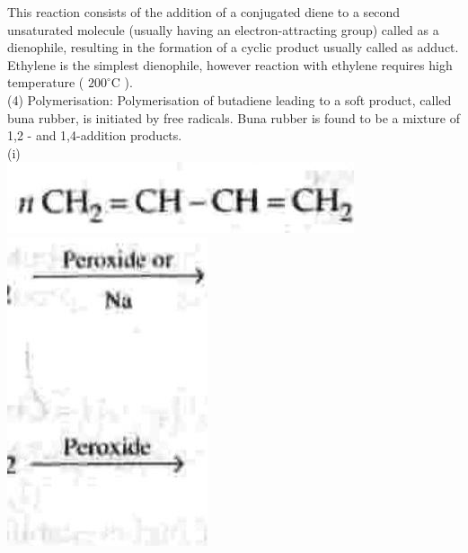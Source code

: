 \documentclass[10pt]{article}
\begin{document}
This reaction consists of the addition of a conjugated diene to a second unsaturated molecule (usually having an electron-attracting group) called as a dienophile, resulting in the formation of a cyclic product usually called as adduct. Ethylene is the simplest dienophile, however reaction with ethylene requires high temperature ( $200^{\circ} \mathrm{C}$ ).\\
(4) Polymerisation: Polymerisation of butadiene leading to a soft product, called buna rubber, is initiated by free radicals. Buna rubber is found to be a mixture of 1,2 - and 1,4-addition products.\\
(i)\\
\includegraphics[max width=\textwidth, center]{2025_01_28_8470952b98110cec3aabg-196(1)}\\
\includegraphics[max width=\textwidth, center]{2025_01_28_8470952b98110cec3aabg-196(4)}\\
\end{document}
